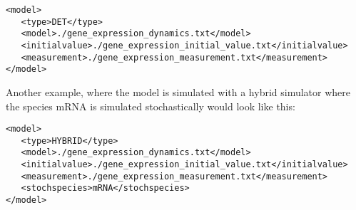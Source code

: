 \documentclass[11pt]{article} %
\begin{document}
\begin{verbatim}
<model>
   <type>DET</type>
   <model>./gene_expression_dynamics.txt</model>
   <initialvalue>./gene_expression_initial_value.txt</initialvalue>
   <measurement>./gene_expression_measurement.txt</measurement>
</model>
\end{verbatim}

Another example, where the model is simulated with a hybrid simulator where the species mRNA is simulated stochastically would look like this: 

\begin{verbatim}
<model>
   <type>HYBRID</type>
   <model>./gene_expression_dynamics.txt</model>
   <initialvalue>./gene_expression_initial_value.txt</initialvalue>
   <measurement>./gene_expression_measurement.txt</measurement>
   <stochspecies>mRNA</stochspecies>
</model>
\end{verbatim}


\end{document}
